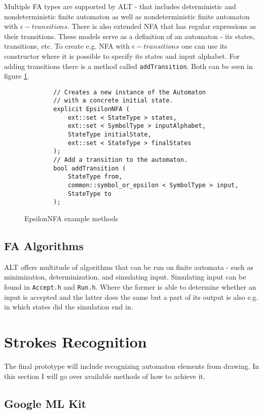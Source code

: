 Multiple FA types are supported by ALT - that includes deterministic and nondeterministic finite automaton as well as nondeterministic finite automaton with $\epsilon-transitions$. There is also extended NFA that has regular expressions as their transitions. These models serve as a definition of an automaton - its states, transitions, etc. To create e.g. NFA with $\epsilon-transitions$ one can use its constructor where it is possible to specify its states and input alphabet. For adding transitions there is a method called \lstinline{addTransition}. Both can be seen in figure \ref{epsilon-nfa-methods}.

\begin{figure}
    \begin{lstlisting}
        // Creates a new instance of the Automaton
        // with a concrete initial state.
        explicit EpsilonNFA ( 
            ext::set < StateType > states,
            ext::set < SymbolType > inputAlphabet, 
            StateType initialState, 
            ext::set < StateType > finalStates
        );
        // Add a transition to the automaton.
        bool addTransition ( 
            StateType from,
            common::symbol_or_epsilon < SymbolType > input,
            StateType to 
        );
    \end{lstlisting}
    \caption{EpsilonNFA example methods}\label{epsilon-nfa-methods}
\end{figure}

\subsection{FA Algorithms}

ALT offers multitude of algorithms that can be run on finite automata - such as minimization, determinization, and simulating input. Simulating input can be found in \lstinline{Accept.h} and \lstinline{Run.h}. Where the former is able to determine whether an input is accepted and the latter does the same but a part of its output is also e.g. in which states did the simulation end in.

\section{Strokes Recognition}

The final prototype will include recognizing automaton elements from drawing. In this section I will go over available methods of how to achieve it.

\subsection{Google ML Kit}

